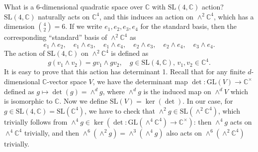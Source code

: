 \documentclass{article}
\newcommand{\bC}{\mathbb{C}}
\newcommand{\SL}{\mathrm{SL}}
\newcommand{\GL}{\mathrm{GL}}
\begin{document}
What is a 6-dimensional quadratic space over $\bC$ with $\SL(4, \mathbb{C})$ action?
$\SL(4, \mathbb{C})$ naturally acts on $\mathbb{C}^{4}$, and this induces an action on $\wedge^{2}\mathbb{C}^{4}$, which has a dimension $\binom{4}{2}= 6$.
If we write $e_1, e_2, e_3, e_4$ for the standard basis, then the corresponding ``standard'' basis of $\wedge^2 \bC^4$ as
$$
e_1 \wedge e_2, \quad e_1 \wedge e_3, \quad e_1 \wedge e_4, \quad e_2 \wedge e_3, \quad e_2 \wedge e_4, \quad e_3 \wedge e_4.
$$
The action of $\SL(4, \bC)$ on $\wedge^2 \bC^4$ is defined as
$$
g(v_{1}\wedge v_{2}) = gv_{1}\wedge gv_{2},\quad g\in \SL(4, \mathbb{C}), \,v_{1}, v_{2}\in \mathbb{C}^{4}.
$$
It is easy to prove that this action has determinant 1. Recall that for any finite $d$-dimensional $\mathbb{C}$-vector space $V$, we have the determinant map $\det:\GL(V)\to \mathbb{C}^{\times}$ defined as $g\mapsto \det(g) = \wedge^{d}g$, where $\wedge^{d}g$ is the induced map on $\wedge^{d}V$ which is isomorphic to $\mathbb{C}$. 
Now we define $\SL(V) = \ker(\det)$. 
In our case, for $g\in \SL(4, \mathbb{C}) = \SL(\mathbb{C}^{4})$, we have to check that $\wedge^{2}g\in \SL(\wedge^{2}\mathbb{C}^{4})$, which trivially follows from $\wedge^{4}g \in \ker(\det:\GL(\wedge^{4}\mathbb{C}^{4})\to \mathbb{C}^{\times})$: then $\wedge^{4}g$ acts on $\wedge^{4}\mathbb{C}^{4}$ trivially, and then $\wedge^{6}(\wedge^{2}g) = \wedge^{3}(\wedge^{4}g)$ also acts on $\wedge^{6}(\wedge^{2}\mathbb{C}^{4})$ trivially.  
\end{document}
